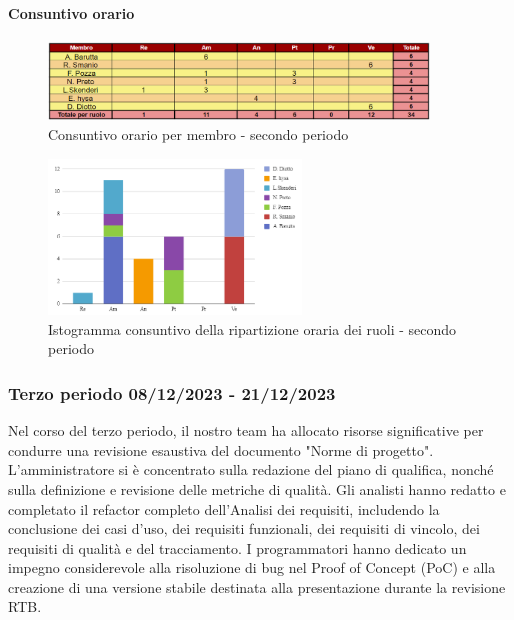 \paragraph*{Consuntivo orario } \hspace{1pt}

\begin{figure}[H]
    \centering
    \includegraphics[width=0.9\textwidth]{../Images/consuntivoOrario2Periodo.png}
    \caption{Consuntivo orario per membro - secondo periodo}
    \label{fig:Constuntivo_orario_2}
\end{figure}

\begin{figure}[H]
    \centering
    \includegraphics[width=0.6\textwidth]{../Images/consuntivoDivisioneRuoli2Periodo.png}
    \caption{Istogramma consuntivo della ripartizione oraria dei ruoli - secondo periodo}
    \label{fig:Consuntivo_ripartizione_oraria_2}
\end{figure}




\subsubsection{Terzo periodo  08/12/2023 - 21/12/2023}
Nel corso del terzo periodo, il nostro team ha allocato risorse significative per condurre una revisione esaustiva del documento "Norme di progetto". L'amministratore si è concentrato sulla redazione del piano di qualifica, nonché sulla definizione e revisione delle metriche di qualità. Gli analisti hanno redatto e completato il refactor completo dell'Analisi dei requisiti, includendo la conclusione dei casi d'uso, dei requisiti funzionali, dei requisiti di vincolo, dei requisiti di qualità e del tracciamento. I programmatori hanno dedicato un impegno considerevole alla risoluzione di bug nel Proof of Concept (PoC) e alla creazione di una versione stabile destinata alla presentazione durante la revisione RTB.

